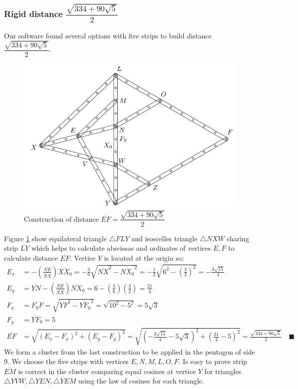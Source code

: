 \documentclass[11pt]{article}
\begin{document}
\subsubsection{Rigid distance $\dfrac{\sqrt{334 + 90\sqrt5}}2$}

Our software found several options with five strips to build distance$\dfrac{\sqrt{334 + 90\sqrt5}}2$.

\begin{figure}[H]
\centering
\includegraphics[scale=1]{9/cluster9b2}
\caption{Construction of distance $\overline{EF}=\dfrac{\sqrt{334 + 90\sqrt5}}2$}
\label{fig:cluster9b2}
\end{figure}

Figure \ref{fig:cluster9b2} show equilateral triangle $\triangle{FLY}$ and isoscelles triangle $\triangle{NXW}$ sharing strip $\overline{LY}$ which helps to calculate abscissas and ordinates of vertices $E,F$ to calculate distance $\overline{EF}$. Vertice $Y$ is located at the origin so:
\begin{align}
E_x &= - \left(\frac{\overline{NE}}{\overline{NX}}\right)\overline{XX_0}
 = -\frac{3}6\sqrt{\overline{NX}^2 - \overline{NX_0}^2}
 = -\frac{1}{2}\sqrt{6^2 - \left(\frac{3}2\right)^2} = -\frac{3\sqrt{15}}4 \\
E_y &= \overline{YN} - \left(\frac{\overline{NE}}{\overline{NX}}\right)\overline{NX_0}
 = 6 - \left(\frac{3}6\right)\left(\frac{3}2\right) = \frac{21}4\\
F_x &= \overline{F_0F} = \sqrt{\overline{YF}^2 - \overline{YF_0}^2}
 = \sqrt{10^2 - 5^2} = 5\sqrt3\\
F_y &= \overline{YF_0} = 5\\
\overline{EF} &= \sqrt{(E_x - F_x)^2 + (E_y - F_y)^2}
 = \sqrt{\left(-\frac{3\sqrt{15}}{4} -5\sqrt3 \right)^2 + \left(\frac{21}4 - 5\right)^2}
 = \frac{\sqrt{334+90\sqrt5}}2 \quad\blacksquare
\end{align}
We form a cluster from the last construction to be applied in the pentagon of side $9$. We choose the five strips with vertices $E,N,M,L,O,F$. Is easy to prove strip $\overline{EM}$ is correct in the cluster comparing equal cosines at vertice $Y$ for triangles $\triangle{YVW},\triangle{YEN},\triangle{YEM}$ using the law of cosines for each triangle.
\end{document}
